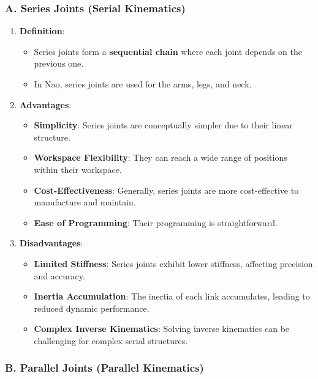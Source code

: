 \documentclass[conference]{IEEEtran}
\begin{document}
\subsubsection*{A. Series Joints (Serial Kinematics)}

\begin{enumerate}
    \item \textbf{Definition}:
        \begin{itemize}
            \item Series joints form a \textbf{sequential chain} where each joint depends on the previous one.
            \item In Nao, series joints are used for the arms, legs, and neck.
        \end{itemize}
    \item \textbf{Advantages}:
        \begin{itemize}
            \item \textbf{Simplicity}: Series joints are conceptually simpler due to their linear structure.
            \item \textbf{Workspace Flexibility}: They can reach a wide range of positions within their workspace.
            \item \textbf{Cost-Effectiveness}: Generally, series joints are more cost-effective to manufacture and maintain.
            \item \textbf{Ease of Programming}: Their programming is straightforward.
        \end{itemize}
    \item \textbf{Disadvantages}:
        \begin{itemize}
            \item \textbf{Limited Stiffness}: Series joints exhibit lower stiffness, affecting precision and accuracy.
            \item \textbf{Inertia Accumulation}: The inertia of each link accumulates, leading to reduced dynamic performance.
            \item \textbf{Complex Inverse Kinematics}: Solving inverse kinematics can be challenging for complex serial structures.
        \end{itemize}
\end{enumerate}

\subsubsection*{B. Parallel Joints (Parallel Kinematics)}
\end{document}
